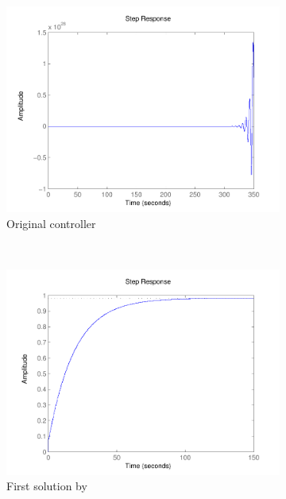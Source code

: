 \documentclass[final]{sig-alternate-05-2015}
\begin{document}
\begin{figure}
    \centering
    \begin{subfigure}[b]{0.3\textwidth}
        \includegraphics[width=\textwidth]{figures/runningexample_step0.pdf}
        \caption{Original controller}
        \label{fig:step0}
    \end{subfigure}
    ~
    \begin{subfigure}[b]{0.3\textwidth}
        \includegraphics[width=\textwidth]{figures/runningexample_step1.pdf}
        \caption{First solution by \tool}
        \label{fig:step1}
    \end{subfigure}
    ~
    \begin{subfigure}[b]{0.3\textwidth}

\end{subfigure}
\end{figure}
\end{document}
